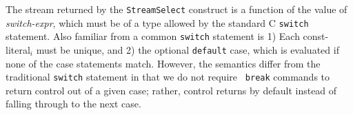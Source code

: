 The stream returned by the {\tt StreamSelect} construct is a function
of the value of {\it switch-expr}, which must be of a type allowed by
the standard C {\tt switch} statement.  Also familiar from a common
{\tt switch} statement is 1) Each const-literal$_i$ must be unique,
and 2) the optional {\tt default} case, which is evaluated if none of
the case statements match.  However, the semantics differ from the
traditional {\tt switch} statement in that we do not require {\tt
break} commands to return control out of a given case; rather, control
returns by default instead of falling through to the next case.


